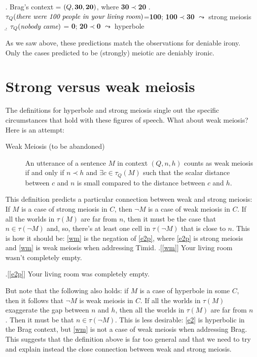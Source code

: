 \documentclass[a4paper,12pt,twoside]{article}
\begin{document}
\ex. Brag's context = $(Q,\mbox{\bf 30},\mbox{\bf 20})$, where {\bf 30}$\prec${\bf 20}
\a. $\tau_Q(\mbox{\em there were 100 people in your living room})$={\bf 100}; {\bf 100}$\prec${\bf 30} $\leadsto$ strong meiosis
\b. $\tau_Q(\mbox{\em nobody came})$ = {\bf 0}; {\bf 20}$\prec${\bf 0} $\leadsto$ hyperbole

As we saw above, these predictions match the observations for deniable irony. Only the cases predicted to be (strongly) meiotic are deniably ironic.

\section{Strong versus weak meiosis}


\noindent The definitions for hyperbole and strong meiosis single out the specific circumstances that hold with these figures of speech. What about weak meiosis? Here is an attempt:

\begin{description}
\item[{Weak Meiosis (to be abandoned)}] An utterance of a sentence \(M\) in context \(( Q,n,h)\) counts as weak meiosis if and only if \(n\prec h\) and \(\exists c\in\tau_{ Q}(M)\) such that the scalar distance between \(c\) and \(n\) is small compared to the distance between \(c\) and \(h\).
\end{description}	
	
  This definition predicts a particular connection between weak and strong meiosis: If \(M\) is a case of strong meiosis in \(C\), then \(\neg M\) is a case of weak meiosis in \(C\). If all the worlds in \(\tau(M)\) are far from \(n\), then it must be the case that \(n\in\tau(\neg M)\) and, so, there's at least one cell in \(\tau(\neg M)\) that is close to \(n\). This is how it should be: \ref{wm} is the negation of \ref{e2p}, where \ref{e2p} is strong meiosis and \ref{wm} is weak meiosis when addressing Timid.
\ex.[\ref{wm}] Your living room wasn't completely empty.

\ex.[\ref{e2p}] Your living room was completely empty.

But note that the following also holds: if \(M\) is a case of hyperbole in some \(C\), then it follows that \(\neg M\) is weak meiosis in \(C\). If all the worlds in $\tau(M)$ exaggerate the gap between $n$ and $h$, then all the worlds in $\tau(M)$ are far from $n$. Then it must be that $n\in\tau(\neg M)$. This is less desirable: \ref{e2} is hyperbolic in the Brag context, but \ref{wm} is not a case of weak meiosis when addressing Brag. This suggests that the definition above is far too general and that we need to try and explain instead the close connection between weak and strong meiosis. 
\end{document}
